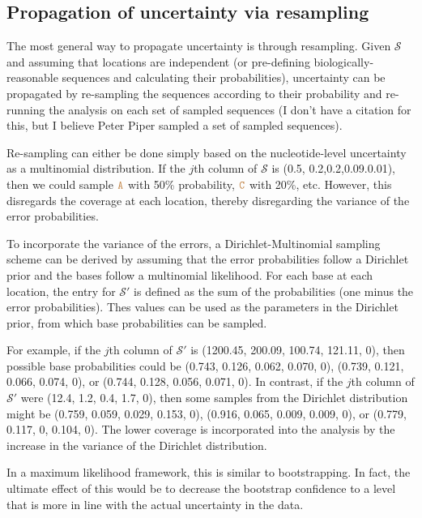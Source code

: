 \documentclass[
]{article}
\newcommand{\sq}[1]{\texttt{\textcolor{brown}{#1}}}
\newcommand{\nps}{\mathcal{S}} %
\begin{document}
\hypertarget{propagation-of-uncertainty-via-resampling}{%
\subsection{Propagation of uncertainty via
resampling}\label{propagation-of-uncertainty-via-resampling}}

The most general way to propagate uncertainty is through resampling.
Given \(\nps\) and assuming that locations are independent (or
pre-defining biologically-reasonable sequences and calculating their
probabilities), uncertainty can be propagated by re-sampling the
sequences according to their probability and re-running the analysis on
each set of sampled sequences (I don't have a citation for this, but I
believe Peter Piper sampled a set of sampled sequences).

Re-sampling can either be done simply based on the nucleotide-level
uncertainty as a multinomial distribution. If the \(j\)th column of
\(\nps\) is (0.5, 0.2,0.2,0.09.0.01), then we could sample \(\sq{A}\)
with 50\% probability, \(\sq{C}\) with 20\%, etc. However, this
disregards the coverage at each location, thereby disregarding the
variance of the error probabilities.

To incorporate the variance of the errors, a Dirichlet-Multinomial
sampling scheme can be derived by assuming that the error probabilities
follow a Dirichlet prior and the bases follow a multinomial likelihood.
For each base at each location, the entry for \(\nps'\) is defined as
the sum of the probabilities (one minus the error probabilities). Thes
values can be used as the parameters in the Dirichlet prior, from which
base probabilities can be sampled.

For example, if the \(j\)th column of \(\nps'\) is (1200.45, 200.09,
100.74, 121.11, 0), then possible base probabilities could be (0.743,
0.126, 0.062, 0.070, 0), (0.739, 0.121, 0.066, 0.074, 0), or (0.744,
0.128, 0.056, 0.071, 0). In contrast, if the \(j\)th column of \(\nps'\)
were (12.4, 1.2, 0.4, 1.7, 0), then some samples from the Dirichlet
distribution might be (0.759, 0.059, 0.029, 0.153, 0), (0.916, 0.065,
0.009, 0.009, 0), or (0.779, 0.117, 0, 0.104, 0). The lower coverage is
incorporated into the analysis by the increase in the variance of the
Dirichlet distribution.

In a maximum likelihood framework, this is similar to bootstrapping. In
fact, the ultimate effect of this would be to decrease the bootstrap
confidence to a level that is more in line with the actual uncertainty
in the data.
\end{document}

